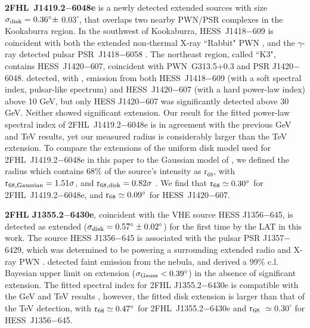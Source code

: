 {\bfseries 2FHL~J1419.2$-$6048e} is a newly detected extended sources with size
${\rm \sigma_{disk} =  0.36 ^{\circ} \pm}$ $0.03 ^{\circ}$, that overlaps two nearby PWN/PSR complexes in the Kookaburra region. In the southwest of Kookaburra, HESS~J1418$-$609 \citep{AharonianKook06} is coincident with both the extended non-thermal X-ray ``Rabbit" PWN \citep[G313.3+0.1,][]{Roberts99}, and the $\gamma$-ray detected pulsar PSR~J1418$-$6058 \citep{AbdoBlindPSR09}. The northeast region, called ``K3", contains HESS~J1420$-$607, coincident with PWN~G313.5+0.3 and PSR J1420$-$6048. \cite{Acero13} detected, with \lat, emission from both HESS~J1418$-$609 (with a soft spectral index, pulsar-like spectrum) and HESS~J1420$-$607 (with a hard power-law index) above 10 GeV, but only HESS J1420$-$607 was significantly detected above 30 GeV. Neither showed significant extension. Our result for the fitted power-law spectral index of 2FHL~J1419.2$-$6048e is in agreement with the previous GeV and TeV results, yet our measured radius is considerably larger than the TeV extension. To compare the extensions of the uniform disk model used for 2FHL~J1419.2$-$6048e in this paper to the Gaussian model of \cite{AharonianKook06}, we defined the radius which contains 68\% of the source's intensity as r$_{68}$, with ${\rm r_{68,Gaussian} = 1.51\sigma}$, and ${\rm r_{68,disk} = 0.82\sigma}$  \citep{Lande12}. We find that ${\rm r_{68} \simeq 0.30^{\circ}}$ for 2FHL~J1419.2$-$6048e, and ${\rm r_{68}} \simeq 0.09^{\circ}$ for HESS~J1420$-$607.

{\bfseries 2FHL J1355.2$-$6430e}, coincident with the VHE source HESS J1356$-$645, is detected as extended (${\rm \sigma_{disk} =  0.57^{\circ} \pm 0.02^{\circ}}$) for the first time by the LAT in this work. The  source HESS J1356$-$645 \citep{Abramowski11} is associated with the pulsar PSR J1357$-$6429, which was determined to be powering a surrounding extended radio and X-ray PWN \citep{Lemoine-Goumard11}. \cite{Acero13} detected faint emission from the nebula, and derived a 99\% c.l. Bayesian upper limit on extension (${\rm \sigma_{Gauss} < 0.39^{\circ}}$) in the absence of significant extension. The fitted spectral index for 2FHL J1355.2$-$6430e is compatible with the GeV and TeV results \citep{Acero13,Abramowski11}, however, the fitted disk extension is larger than that of the TeV detection, with ${\rm r_{68} \simeq 0.47^{\circ}}$ for 2FHL~J1355.2$-$6430e and ${\rm r_{68}}$ $\simeq 0.30^{\circ}$ for HESS~J1356$-$645.

